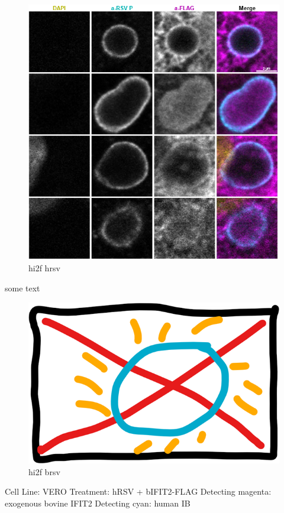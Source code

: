 \begin{figure}
    \centering
    \includegraphics[width=1\linewidth]{09. Chapter 4//Figs//03. IFIT2-FLAG/04. hi2f hrsv.png}
    \caption[hi2f hrsv]{hi2f hrsv}
    \label{hi2f hrsv}
\end{figure}

some text

\begin{figure}
    \centering
    \includegraphics[width=0.5\linewidth]{09. Chapter 4//Figs//03. IFIT2-FLAG/00. placeholder.png}
    \caption[hi2f brsv]{hi2f brsv}
    \label{hi2f brsv}
\end{figure}

Cell Line: VERO \newline
Treatment: hRSV + bIFIT2-FLAG \newline
Detecting magenta: exogenous bovine IFIT2 \newline
Detecting cyan: human IB \newline

